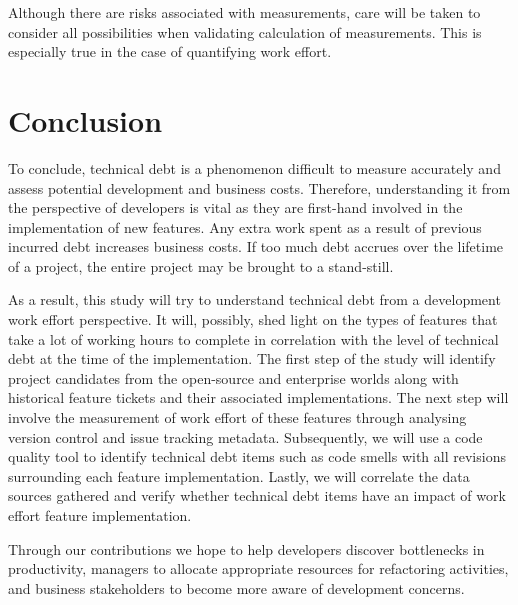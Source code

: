 Although there are risks associated with measurements, care will be taken to
consider all possibilities when validating calculation of measurements. This is
especially true in the case of quantifying work effort.

\section{Conclusion}
\label{conclusions}

To conclude, technical debt is a phenomenon difficult to measure accurately and
assess potential development and business costs. Therefore, understanding it
from the perspective of developers is vital as they are first-hand involved in
the implementation of new features. Any extra work spent as a result of previous
incurred debt increases business costs. If too much debt accrues over the
lifetime of a project, the entire project may be brought to a stand-still.

As a result, this study will try to understand technical debt from a development
work effort perspective. It will, possibly, shed light on the types of features
that take a lot of working hours to complete in correlation with the level of
technical debt at the time of the implementation. The first step of the study
will identify project candidates from the open-source and enterprise worlds
along with historical feature tickets and their associated implementations. The
next step will involve the measurement of work effort of these features through
analysing version control and issue tracking metadata. Subsequently, we will use
a code quality tool to identify technical debt items such as code smells with
all revisions surrounding each feature implementation. Lastly, we will correlate
the data sources gathered and verify whether technical debt items have an impact
of work effort feature implementation.

Through our contributions we hope to help developers discover bottlenecks in
productivity, managers to allocate appropriate resources for refactoring
activities, and business stakeholders to become more aware of development
concerns.




